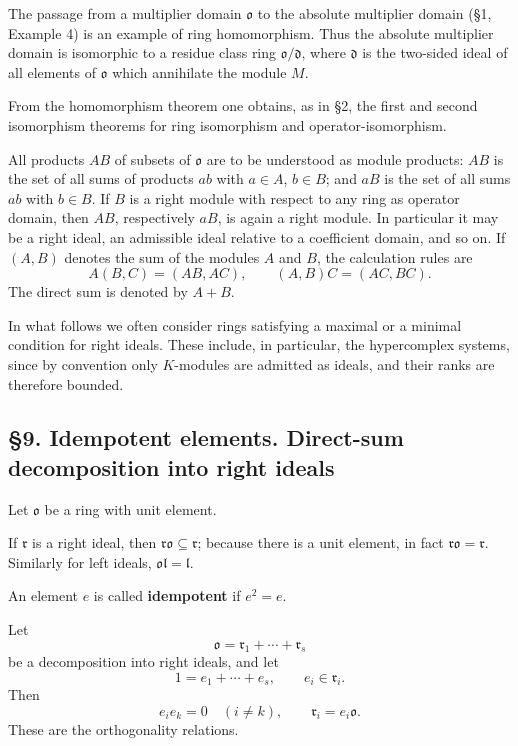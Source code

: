 \documentclass[11pt]{article}
\begin{document}
The passage from a multiplier domain \(\mathfrak{o}\) to the absolute
multiplier domain (§1, Example 4) is an example of ring homomorphism.
Thus the absolute multiplier domain is isomorphic to a residue class
ring \(\mathfrak{o}/\mathfrak d\), where \(\mathfrak d\) is the
two-sided ideal of all elements of \(\mathfrak{o}\) which annihilate the
module \(M\).

From the homomorphism theorem one obtains, as in §2, the first and
second isomorphism theorems for ring isomorphism and
operator-isomorphism.

All products \(AB\) of subsets of \(\mathfrak{o}\) are to be understood
as module products: \(AB\) is the set of all sums of products \(ab\)
with \(a\in A\), \(b\in B\); and \(aB\) is the set of all sums \(ab\)
with \(b\in B\). If \(B\) is a right module with respect to any ring as
operator domain, then \(AB\), respectively \(aB\), is again a right
module. In particular it may be a right ideal, an admissible ideal
relative to a coefficient domain, and so on. If \((A,B)\) denotes the
sum of the modules \(A\) and \(B\), the calculation rules are \[
  A(B,C)=(AB,AC),
  \qquad
  (A,B)C=(AC,BC).
\] The direct sum is denoted by \(A+B\).

In what follows we often consider rings satisfying a maximal or a
minimal condition for right ideals. These include, in particular, the
hypercomplex systems, since by convention only \(K\)-modules are
admitted as ideals, and their ranks are therefore bounded.

\subsection{§9. Idempotent elements. Direct-sum decomposition into right
ideals}\label{idempotent-elements.-direct-sum-decomposition-into-right-ideals}

Let \(\mathfrak{o}\) be a ring with unit element.

If \(\mathfrak r\) is a right ideal, then
\(\mathfrak r\mathfrak{o}\subseteq\mathfrak r\); because there is a unit
element, in fact \(\mathfrak r\mathfrak{o}=\mathfrak r\). Similarly for
left ideals, \(\mathfrak{o}\mathfrak l=\mathfrak l\).

An element \(e\) is called \textbf{idempotent} if \(e^2=e\).

Let \[
  \mathfrak{o}=\mathfrak r_1+\cdots+\mathfrak r_s
\] be a decomposition into right ideals, and let \[
  1=e_1+\cdots+e_s,
  \qquad e_i\in\mathfrak r_i.
\] Then \[
  e_i e_k=0\quad(i\ne k),
  \qquad
  \mathfrak r_i=e_i\mathfrak{o}.
\] These are the orthogonality relations.
\end{document}
